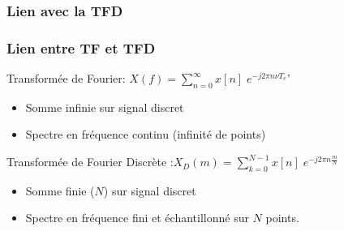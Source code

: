 \documentclass{beamer}
\begin{document}
\subsubsection{Lien avec la TFD}
\begin{frame} 
\frametitle{Lien entre TF et TFD}

Transformée de Fourier: $X(f) = \sum_{n = 0}^{\infty} x[n] \; e^{-j 2 \pi n \nu T_e}$' 
\vspace{0.2cm}
\begin{itemize}
\item<2-> Somme infinie sur signal discret
\vspace{0.2cm}
\item<3-> Spectre en fréquence continu (infinité de points)
\end{itemize}
\vspace{1cm}
Transformée de Fourier Discrète :$X_D(m) = \sum_{k = 0}^{N-1} x[n] \; e^{-j 2 \pi n \frac{m}{N} }$
\vspace{0.2cm}
\begin{itemize}
\item<2-> Somme finie ($N$) sur signal discret 
\vspace{0.2cm}
\item<3-> Spectre en fréquence fini et échantillonné sur $N$ points.
\end{itemize}

\end{frame}
\end{document}
